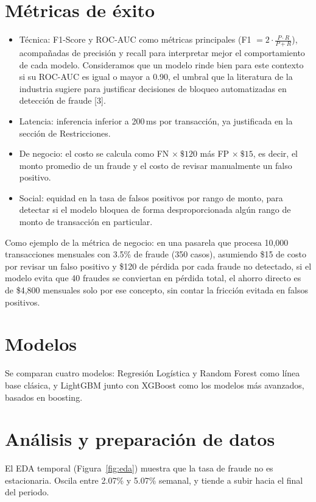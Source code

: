 \documentclass[10pt]{article}
\begin{document}
\section{Métricas de éxito}
\label{sec:metricas}
\begin{itemize}
  \item Técnica: F1-Score y ROC-AUC como métricas principales (F1 $= 2\cdot\frac{P\cdot R}{P+R}$), acompañadas de precisión y recall para interpretar mejor el comportamiento de cada modelo. Consideramos que un modelo rinde bien para este contexto si su ROC-AUC es igual o mayor a 0.90, el umbral que la literatura de la industria sugiere para justificar decisiones de bloqueo automatizadas en detección de fraude [3].
  \item Latencia: inferencia inferior a 200\,ms por transacción, ya justificada en la sección de Restricciones.
  \item De negocio: el costo se calcula como FN $\times\ \$120$ más FP $\times\ \$15$, es decir, el monto promedio de un fraude y el costo de revisar manualmente un falso positivo.
  \item Social: equidad en la tasa de falsos positivos por rango de monto, para detectar si el modelo bloquea de forma desproporcionada algún rango de monto de transacción en particular.
\end{itemize}

Como ejemplo de la métrica de negocio: en una pasarela que procesa 10,000 transacciones mensuales con 3.5\% de fraude (350 casos), asumiendo \$15 de costo por revisar un falso positivo y \$120 de pérdida por cada fraude no detectado, si el modelo evita que 40 fraudes se conviertan en pérdida total, el ahorro directo es de \$4,800 mensuales solo por ese concepto, sin contar la fricción evitada en falsos positivos.

\section{Modelos}
\label{sec:modelado}
Se comparan cuatro modelos: Regresión Logística y Random Forest como línea base clásica, y LightGBM junto con XGBoost como los modelos más avanzados, basados en boosting.

\section{Análisis y preparación de datos}
El EDA temporal (Figura~\ref{fig:eda}) muestra que la tasa de fraude no es estacionaria. Oscila entre 2.07\% y 5.07\% semanal, y tiende a subir hacia el final del periodo.
\end{document}
